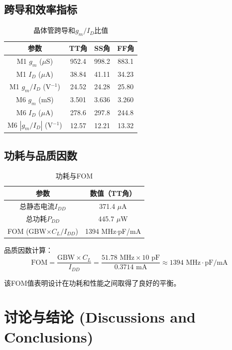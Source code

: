 \documentclass[UTF8,12pt,a4paper]{ctexart}
\begin{document}
\subsection{跨导和效率指标}

\begin{table}[h]
\centering
\caption{晶体管跨导和$g_m/I_D$比值}
\begin{tabular}{|c|c|c|c|}
\hline
\textbf{参数} & \textbf{TT角} & \textbf{SS角} & \textbf{FF角} \\
\hline
M1 $g_m$ ($\mu$S) & 952.4 & 998.2 & 883.1 \\
M1 $I_D$ ($\mu$A) & 38.84 & 41.11 & 34.23 \\
M1 $g_m/I_D$ (V$^{-1}$) & 24.52 & 24.28 & 25.80 \\
M6 $g_m$ (mS) & 3.501 & 3.636 & 3.260 \\
M6 $I_D$ ($\mu$A) & 278.6 & 297.8 & 244.8 \\
M6 $|g_m/I_D|$ (V$^{-1}$) & 12.57 & 12.21 & 13.32 \\
\hline
\end{tabular}
\end{table}

\subsection{功耗与品质因数}

\begin{table}[h]
\centering
\caption{功耗与FOM}
\begin{tabular}{|c|c|}
\hline
\textbf{参数} & \textbf{数值（TT角）} \\
\hline
总静态电流$I_{DD}$ & 371.4 $\mu$A \\
总功耗$P_{DD}$ & 445.7 $\mu$W \\
FOM (GBW$\times C_L/I_{DD}$) & 1394 MHz$\cdot$pF/mA \\
\hline
\end{tabular}
\end{table}

品质因数计算：
\begin{equation}
\text{FOM} = \frac{\text{GBW} \times C_L}{I_{DD}} = \frac{51.78\text{ MHz} \times 10\text{ pF}}{0.3714\text{ mA}} \approx 1394\text{ MHz}\cdot\text{pF/mA}
\end{equation}

该FOM值表明设计在功耗和性能之间取得了良好的平衡。

\section{讨论与结论 (Discussions and Conclusions)}
\end{document}
